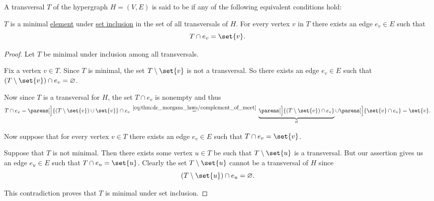 \begin{definition}\label{def:hypergraph_minimal_transversal}
  A transversal \( T \) of the hypergraph \( H = (V, E) \) is said to be  if any of the following equivalent conditions hold:
  \begin{thmenum}
     \( T \) is a minimal \hyperref[def:partially_ordered_set_extremal_points/maximal_and_minimal_element]{element} under \hyperref[def:subset]{set inclusion} in the set of all transversals of \( H \).
     For every vertex \( v \) in \( T \) there exists an edge \( e_v \in E \) such that
    \begin{equation*}
      T \cap e_v = \set{ v }.
    \end{equation*}
  \end{thmenum}
\end{definition}
\begin{proof}
   Let \( T \) be minimal under inclusion among all transversals.

  Fix a vertex \( v \in T \). Since \( T \) is minimal, the set \( T \setminus \set{ v } \) is not a transversal. So there exists an edge \( e_v \in E \) such that \( (T \setminus \set{ v }) \cap e_v = \varnothing \).

  Now since \( T \) is a transversal for \( H \), the set \( T \cap e_v \) is nonempty and thus
  \begin{equation*}
    T \cap e_x
    =
    \parens[\Big]{ (T \setminus \set{ v }) \cup \set{ v } } \cap e_v
    \reloset {\eqref{eq:thm:de_morgans_laws/complement_of_meet}} =
    \underbrace{\parens[\Big]{ (T \setminus \set{ v }) \cap e_v }}_{\varnothing} \cup \parens[\Big]{ \set{ v } \cap e_v }
    =
    \set{ v }.
  \end{equation*}

   Now suppose that for every vertex \( v \in T \) there exists an edge \( e_v \in E \) such that \( T \cap e_v = \set{ v } \).

  Suppose that \( T \) is not minimal. Then there exists some vertex \( u \in T \) be such that \( T \setminus \set{ u } \) is a transversal. But our assertion gives us an edge \( e_u \in E \) such that \( T \cap e_u = \set{ u } \). Clearly the set \( T \setminus \set{ u } \) cannot be a transversal of \( H \) since
  \begin{equation*}
    (T \setminus \set{ u }) \cap e_u = \varnothing.
  \end{equation*}

  This contradiction proves that \( T \) is minimal under set inclusion.
\end{proof}

